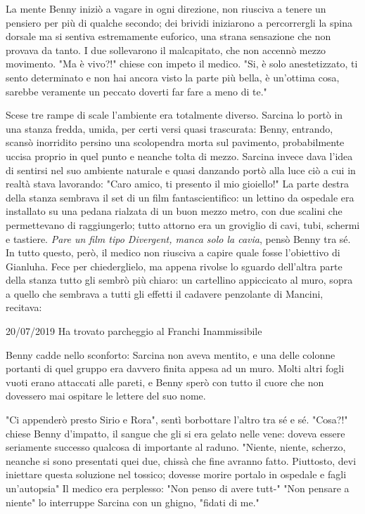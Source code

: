 La mente Benny iniziò a vagare in ogni direzione, non riusciva a tenere un pensiero per più di qualche secondo; dei brividi iniziarono a percorrergli la spina dorsale ma si sentiva estremamente euforico, una strana sensazione che non provava da tanto.
I due sollevarono il malcapitato, che non accennò mezzo movimento.
"Ma è vivo?!" chiese con impeto il medico.
"Si, è solo anestetizzato, ti sento determinato e non hai ancora visto la parte più bella, è un'ottima cosa, sarebbe veramente un peccato doverti far fare a meno di te."

Scese tre rampe di scale l'ambiente era totalmente diverso.
Sarcina lo portò in una stanza fredda, umida, per certi versi quasi trascurata: Benny, entrando, scansò inorridito persino una scolopendra morta sul pavimento, probabilmente uccisa proprio in quel punto e neanche tolta di mezzo.
Sarcina invece dava l'idea di sentirsi nel suo ambiente naturale e quasi danzando portò alla luce ciò a cui in realtà stava lavorando: "Caro amico, ti presento il mio gioiello!"
La parte destra della stanza sembrava il set di un film fantascientifico: un lettino da ospedale era installato su una pedana rialzata di un buon mezzo metro, con due scalini che permettevano di raggiungerlo; tutto attorno era un groviglio di cavi, tubi, schermi e tastiere.
\textit{Pare un film tipo Divergent, manca solo la cavia}, pensò Benny tra sé.
In tutto questo, però, il medico non riusciva a capire quale fosse l'obiettivo di Gianluha.
Fece per chiederglielo, ma appena rivolse lo sguardo dell'altra parte della stanza tutto gli sembrò più chiaro: un cartellino appiccicato al muro, sopra a quello che sembrava a tutti gli effetti il cadavere penzolante di Mancini, recitava:

20/07/2019
Ha trovato parcheggio al Franchi
Inammissibile

Benny cadde nello sconforto: Sarcina non aveva mentito, e una delle colonne portanti di quel gruppo era davvero finita appesa ad un muro. 
Molti altri fogli vuoti erano attaccati alle pareti, e Benny sperò con tutto il cuore che non dovessero mai ospitare le lettere del suo nome.

"Ci appenderò presto Sirio e Rora", sentì borbottare l'altro tra sé e sé. 
"Cosa?!" chiese Benny d'impatto, il sangue che gli si era gelato nelle vene: doveva essere seriamente successo qualcosa di importante al raduno. 
"Niente, niente, scherzo, neanche si sono presentati quei due, chissà che fine avranno fatto. Piuttosto, devi iniettare questa soluzione nel tossico; dovesse morire portalo in ospedale e fagli un'autopsia"
Il medico era perplesso: "Non penso di avere tutt-"
"Non pensare a niente" lo interruppe Sarcina con un ghigno, "fidati di me."

